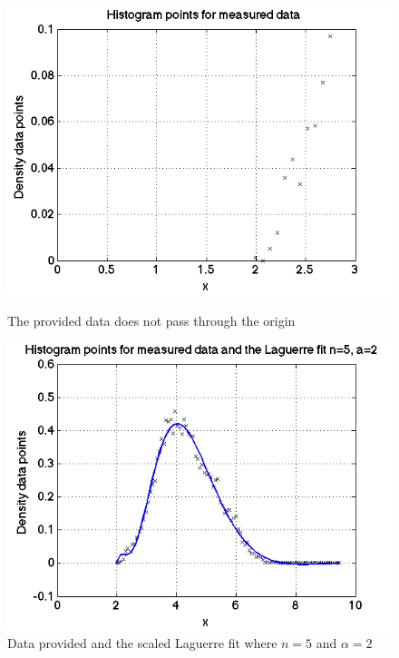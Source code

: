 \documentclass{article}
\begin{document}
\begin{figure}[h]
\centering
	\begin{minipage}[c][][b]{0.45\linewidth}
		\begin{center}
		\includegraphics[scale=0.35]{Matlab/FittingData/Graph/dataorigin.png}  
		\end{center}
		\caption[b]{The provided data does not pass through the origin}
		\label{dataorigin}
	\end{minipage}
\quad\quad\quad\quad
	\begin{minipage}[c][][b]{0.45\linewidth}
		\begin{center}
		\includegraphics[scale=0.35]{Matlab/FittingData/Graph/laguerrefit62.png}
		\end{center}
		\caption[b]{Data provided and the scaled Laguerre fit where $n=5$ and $\alpha = 2$}
		\label{laguerrefit62}
	\end{minipage}

\end{figure}
\end{document}
